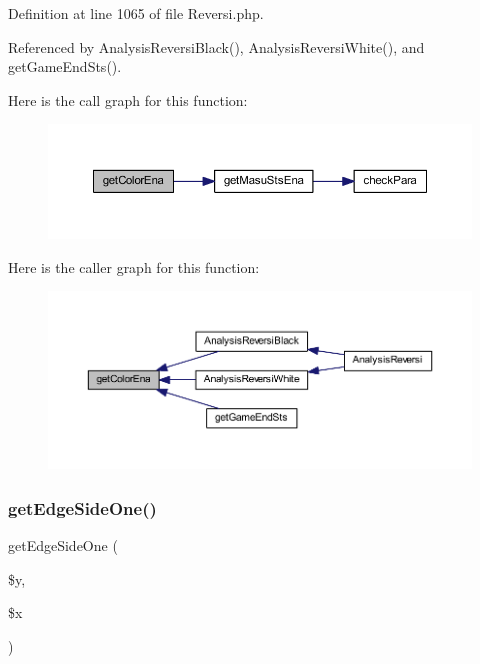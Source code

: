 Definition at line 1065 of file Reversi.\+php.



Referenced by Analysis\+Reversi\+Black(), Analysis\+Reversi\+White(), and get\+Game\+End\+Sts().

Here is the call graph for this function\+:
\nopagebreak
\begin{figure}[H]
\begin{center}
\leavevmode
\includegraphics[width=350pt]{class_reversi_aead5ee041feb6ac2609266614ea06f78_cgraph}
\end{center}
\end{figure}
Here is the caller graph for this function\+:
\nopagebreak
\begin{figure}[H]
\begin{center}
\leavevmode
\includegraphics[width=350pt]{class_reversi_aead5ee041feb6ac2609266614ea06f78_icgraph}
\end{center}
\end{figure}
\mbox{\label{class_reversi_a98aff7f2db3a9feacbe98293c6b80eb4}} 
\subsubsection{\texorpdfstring{get\+Edge\+Side\+One()}{getEdgeSideOne()}}
{\footnotesize\ttfamily get\+Edge\+Side\+One (\begin{DoxyParamCaption}\item[{}]{\$y,  }\item[{}]{\$x }\end{DoxyParamCaption})}



